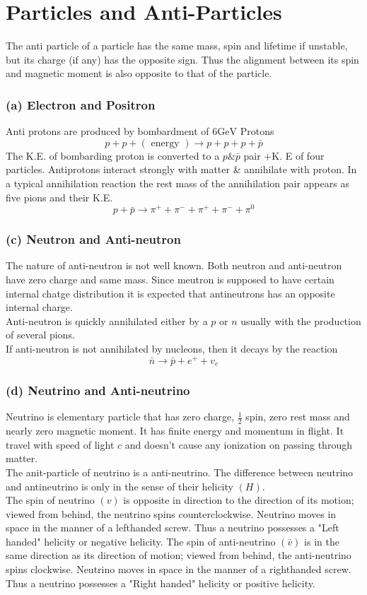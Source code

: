 \section{Particles and Anti-Particles}
The anti particle of a particle has the same mass, spin and lifetime if unstable, but its charge (if any) has the opposite sign. Thus the alignment between its spin and magnetic moment is also opposite to that of the particle.\\
\subsubsection{ (a) Electron and Positron}
Anti protons are produced by bombardment of $6 \mathrm{GeV}$ Protons
$$
p+p+(\text { energy }) \rightarrow p+p+p+\bar{p}
$$
The K.E. of bombarding proton is converted to a $p \& \bar{p}$ pair $+\mathrm{K}$. E of four particles.
Antiprotons interact strongly with matter \& annihilate with proton. In a typical annihilation reaction the rest mass of the annihilation pair appears as five pions and their K.E.
$$
p+\bar{p} \rightarrow \pi^{+}+\pi^{-}+\pi^{+}+\pi^{-}+\pi^0
$$
\subsubsection{ (c) Neutron and Anti-neutron}
The nature of anti-neutron is not well known. Both neutron and anti-neutron have zero charge and same mass. Since meutron is supposed to have certain internal chatge distribution it is expected that antineutrons has an opposite internal charge.\\
Anti-neutron is quickly annihilated either by a $p$ or $n$ usually with the production of several pions. \\
If anti-neutron is not annihilated by nucleons, then it decays by the reaction
$$
\bar{n} \rightarrow \bar{p}+e^{+}+v_e
$$
\subsubsection{ (d) Neutrino and Anti-neutrino}
Neutrino is elementary particle that has zero charge, $\frac{1}{2}$ spin, zero rest mass and nearly zero magnetic moment. It has finite energy and momentum in flight. It travel with speed of light $c$ and doesn't cause any ionization on passing through matter.\\
The anit-particle of neutrino is a anti-neutrino. The difference between neutrino and antineutrino is only in the sense of their helicity $(H)$.\\
The spin of neutrino $(v)$ is opposite in direction to the direction of its motion; viewed from behind, the neutrino spins counterclockwise. Neutrino moves in space in the manner of a lefthanded screw. Thus a neutrino possesses a "Left handed" helicity or negative helicity. The spin of anti-neutrino $(\bar{v})$ is in the same direction as its direction of motion; viewed from behind, the anti-neutrino spins clockwise. Neutrino moves in space in the manner of a righthanded screw. Thus a neutrino possesses a "Right handed" helicity or positive helicity.

